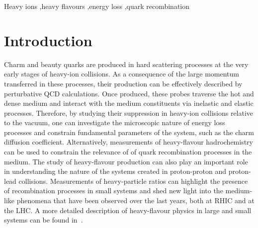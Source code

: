 \documentclass[3p,times,procedia]{elsarticle}
\begin{document}
\begin{frontmatter}
\begin{keyword}
Heavy ions \sep heavy flavours \sep energy loss \sep quark recombination
\end{keyword}
\end{frontmatter}


\section{Introduction}
\label{intro}
Charm and beauty quarks are produced in hard scattering processes at the very early stages of heavy-ion collisions. As a consequence of the 
large momentum transferred in these processes, their production can be effectively described by perturbative QCD calculations. 
Once produced, these probes traverse the hot and dense medium and interact with the medium constituents via inelastic and elastic processes.
Therefore, by studying their suppression in heavy-ion collisions relative to the vacuum, one can investigate the microscopic nature of energy loss processes
and constrain fundamental parameters of the system, such as the charm diffusion coefficient. Alternatively, measurements of 
heavy-flavour hadrochemistry can be used to constrain the relevance of of quark recombination processes in the medium.
The study of heavy-flavour production can also play an important role in understanding the nature of the systems created in proton-proton and 
proton-lead collisions. Measurements of heavy-particle ratios can highlight the presence of recombination 
processes in small systems and shed new light into the medium-like phenomena that have been observed over the last years, both at RHIC and at the LHC. 
A more detailed description of heavy-flavour physics in large and small systems can be found in~\cite{saporegravis,prinorapp,yenjie}.
\end{document}
